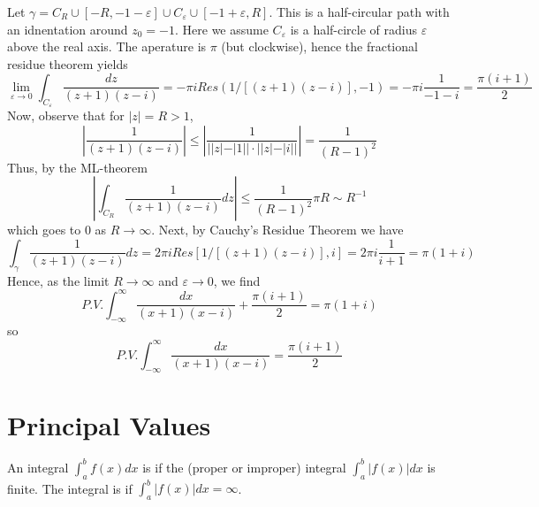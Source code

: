 \begin{example}
    Let $\gamma = C_R\cup[-R,-1-\varepsilon]\cup C_{\varepsilon}\cup[-1+\varepsilon,R]$. This is a half-circular path with an idnentation around $z_0 = -1$. Here we assume $C_{\varepsilon}$ is a half-circle of radius $\varepsilon$ above the real axis. The aperature is $\pi$ (but clockwise), hence the fractional residue theorem yields \begin{equation*}
        \lim\limits_{\varepsilon\rightarrow 0}\int_{C_{\varepsilon}}\frac{dz}{(z+1)(z-i)} = -\pi iRes(1/[(z+1)(z-i)],-1) = -\pi i\frac{1}{-1-i} = \frac{\pi (i+1)}{2}
    \end{equation*}
    Now, observe that for $|z| = R > 1$, $$\left|\frac{1}{(z+1)(z-i)}\right| \leq \left|\frac{1}{||z|-|1||\cdot||z|-|i||}\right| = \frac{1}{(R-1)^2}$$
    Thus, by the ML-theorem \begin{equation*}
        \left|\int_{C_R}\frac{1}{(z+1)(z-i)}dz\right| \leq \frac{1}{(R-1)^2}\pi R \sim R^{-1}
    \end{equation*}
    which goes to $0$ as $R\rightarrow \infty$. Next, by Cauchy's Residue Theorem we have \begin{equation*}
        \int_{\gamma}\frac{1}{(z+1)(z-i)}dz = 2\pi iRes[1/[(z+1)(z-i)],i] = 2\pi i\frac{1}{i+1} = \pi(1+i)
    \end{equation*}
    Hence, as the limit $R\rightarrow \infty$ and $\varepsilon \rightarrow 0$, we find \begin{equation*}
        P.V.\int_{-\infty}^{\infty}\frac{dx}{(x+1)(x-i)} + \frac{\pi (i+1)}{2} = \pi(1+i)
    \end{equation*}
    so \begin{equation*}
        P.V.\int_{-\infty}^{\infty}\frac{dx}{(x+1)(x-i)} = \frac{\pi(i+1)}{2}
    \end{equation*}
\end{example}



\section{Principal Values}

\begin{definition}
    An integral $\int_a^bf(x)dx$ is  if the (proper or improper) integral $\int_a^b|f(x)|dx$ is finite. The integral is  if $\int_a^b|f(x)|dx = \infty$.
\end{definition}

